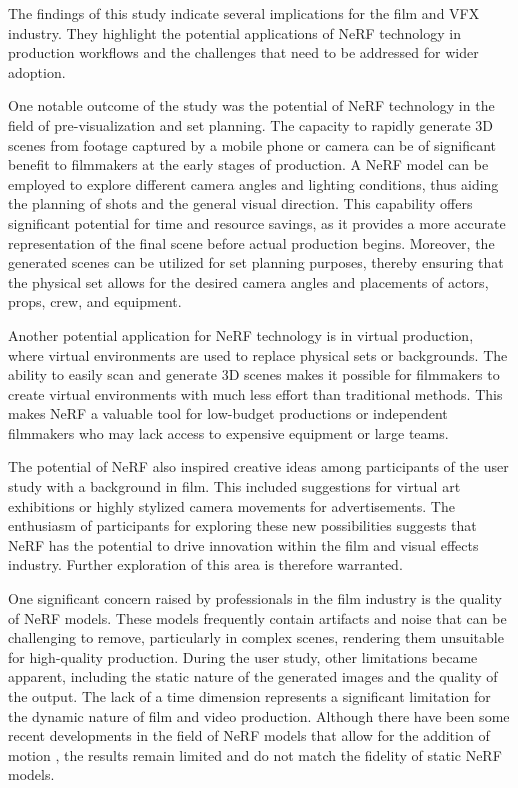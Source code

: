 The findings of this study indicate several implications for the film and VFX industry. 
They highlight the potential applications of NeRF technology in production workflows and the challenges that need to be addressed for wider adoption.

One notable outcome of the study was the potential of NeRF technology in the field of pre-visualization and set planning.
The capacity to rapidly generate 3D scenes from footage captured by a mobile phone or camera can be of significant benefit to filmmakers at the early stages of production.
A NeRF model can be employed to explore different camera angles and lighting conditions, thus aiding the planning of shots and the general visual direction.
This capability offers significant potential for time and resource savings, as it provides a more accurate representation of the final scene before actual production begins.
Moreover, the generated scenes can be utilized for set planning purposes, thereby ensuring that the physical set allows for the desired camera angles and placements of actors, props, crew, and equipment.

Another potential application for NeRF technology is in virtual production, where virtual environments are used to replace physical sets or backgrounds.
The ability to easily scan and generate 3D scenes makes it possible for filmmakers to create virtual environments with much less effort than traditional methods.
This makes NeRF a valuable tool for low-budget productions or independent filmmakers who may lack access to expensive equipment or large teams.

The potential of NeRF also inspired creative ideas among participants of the user study with a background in film.
This included suggestions for virtual art exhibitions or highly stylized camera movements for advertisements.
The enthusiasm of participants for exploring these new possibilities suggests that NeRF has the potential to drive innovation within the film and visual effects industry.
Further exploration of this area is therefore warranted.

One significant concern raised by professionals in the film industry is the quality of NeRF models.
These models frequently contain artifacts and noise that can be challenging to remove, particularly in complex scenes, rendering them unsuitable for high-quality production.
During the user study, other limitations became apparent, including the static nature of the generated images and the quality of the output.
The lack of a time dimension represents a significant limitation for the dynamic nature of film and video production.
Although there have been some recent developments in the field of NeRF models that allow for the addition of motion \cite{fridovich-keil_k-planes_2023}, the results remain limited and do not match the fidelity of static NeRF models.

